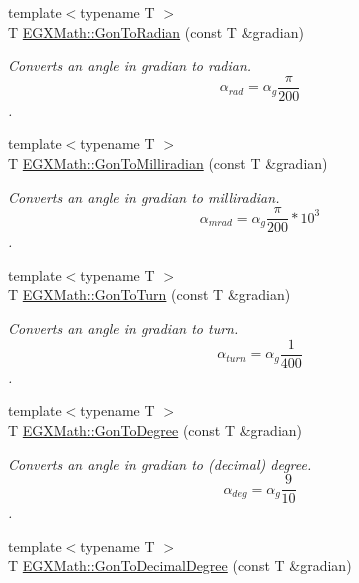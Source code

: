 \begin{DoxyCompactItemize}
\item 
{\footnotesize template$<$typename T $>$ }\\T \mbox{\hyperlink{group___e_g_x_math-_conversions-_angle_conversions-_gon_gafdf7d525a98427da55b86ff420a5ec86}{E\+G\+X\+Math\+::\+Gon\+To\+Radian}} (const T \&gradian)
\begin{DoxyCompactList}\small\item\em Converts an angle in gradian to radian. \[\alpha_{rad}=\alpha_{g}\frac{\pi}{200}\]. \end{DoxyCompactList}\item 
{\footnotesize template$<$typename T $>$ }\\T \mbox{\hyperlink{group___e_g_x_math-_conversions-_angle_conversions-_gon_gae5956f7e80b143f3cc22eb8122c1b745}{E\+G\+X\+Math\+::\+Gon\+To\+Milliradian}} (const T \&gradian)
\begin{DoxyCompactList}\small\item\em Converts an angle in gradian to milliradian. \[\alpha_{mrad}=\alpha_{g}\frac{\pi}{200}*10^3\]. \end{DoxyCompactList}\item 
{\footnotesize template$<$typename T $>$ }\\T \mbox{\hyperlink{group___e_g_x_math-_conversions-_angle_conversions-_gon_gae55acf3fc27d34374b5ec10e0a471b3b}{E\+G\+X\+Math\+::\+Gon\+To\+Turn}} (const T \&gradian)
\begin{DoxyCompactList}\small\item\em Converts an angle in gradian to turn. \[\alpha_{turn}=\alpha_{g}\frac{1}{400}\]. \end{DoxyCompactList}\item 
{\footnotesize template$<$typename T $>$ }\\T \mbox{\hyperlink{group___e_g_x_math-_conversions-_angle_conversions-_gon_gaf1c40076eaf3be4e070ff34045db55d1}{E\+G\+X\+Math\+::\+Gon\+To\+Degree}} (const T \&gradian)
\begin{DoxyCompactList}\small\item\em Converts an angle in gradian to (decimal) degree. \[\alpha_{deg}=\alpha_{g}\frac{9}{10}\]. \end{DoxyCompactList}\item 
{\footnotesize template$<$typename T $>$ }\\T \mbox{\hyperlink{group___e_g_x_math-_conversions-_angle_conversions-_gon_ga737e654bac7b6aa9c18f73b1b83e0605}{E\+G\+X\+Math\+::\+Gon\+To\+Decimal\+Degree}} (const T \&gradian)

\end{DoxyCompactItemize}
